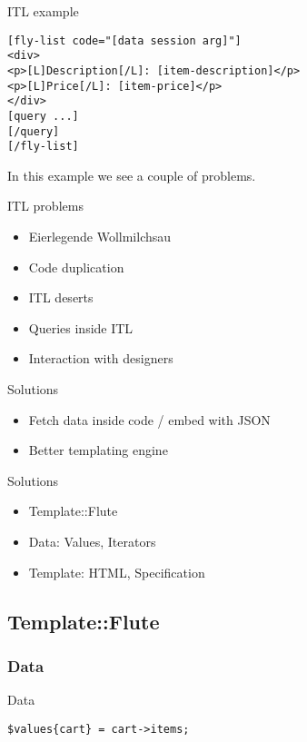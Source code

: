 \begin{frame}[fragile]{ITL example}
\begin{lstlisting}
[fly-list code="[data session arg]"]
<div>
<p>[L]Description[/L]: [item-description]</p>
<p>[L]Price[/L]: [item-price]</p>
</div>
[query ...]
[/query]
[/fly-list]
\end{lstlisting}
\end{frame}

In this example we see a couple of problems.

\begin{frame}{ITL problems}
\begin{itemize}
\item Eierlegende Wollmilchsau
\item Code duplication
\item ITL deserts
\item Queries inside ITL
\item Interaction with designers
\end{itemize}
\end{frame}

\begin{frame}{Solutions}
\begin{itemize}
\item Fetch data inside code / embed with JSON
\item Better templating engine
\end{itemize}
\end{frame}

\begin{frame}{Solutions}
\begin{itemize}
\item Template::Flute
\item Data: Values, Iterators
\item Template: HTML, Specification
\end{itemize}
\end{frame}

\subsection{Template::Flute}
\subsubsection{Data}
\begin{frame}[fragile]{Data}
\begin{lstlisting}
$values{cart} = cart->items;
\end{lstlisting}
\end{frame}

